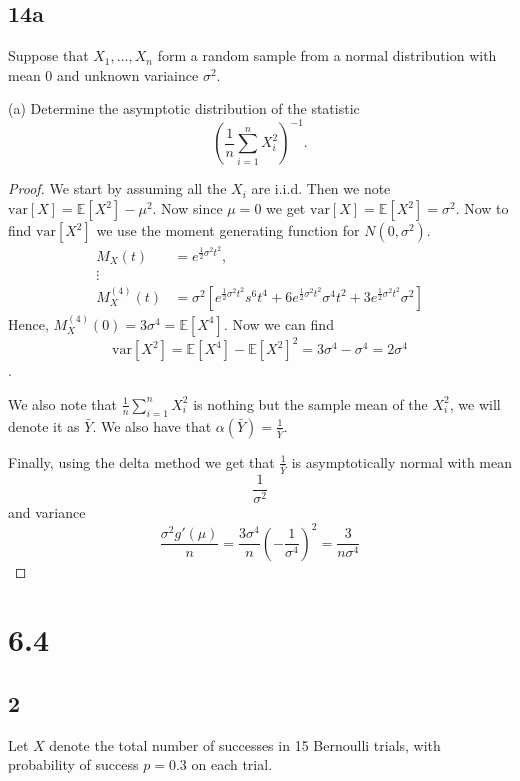 \documentclass{article}
\newcommand{\E}[1]{\mathbb{E}\left[#1\right]}
\newcommand{\var}[1]{\text{var}\left[#1\right]}
\newcommand{\randsamp}{X_1,\dots,X_n}
\newcommand{\mgf}{moment generating function }
\begin{document}
\subsection*{14a}
Suppose that $\randsamp$ form a random sample from a normal distribution with mean 0 and
unknown variaince $\sigma^2$.

(a) Determine the asymptotic distribution of the statistic
\begin{equation*}
    \left(\frac{1}{n}\sum_{i=1}^nX_i^2\right)^{-1}.
\end{equation*}

\begin{proof}
    We start by assuming all the $X_i$ are i.i.d. Then we note $\var{X} = \E{X^2} - \mu^2$.
    Now since $\mu = 0$ we get $\var{X} = \E{X^2} = \sigma^2$. Now to find $\var{X^2}$ we
    use the \mgf for $N(0, \sigma^2)$.
    \begin{align*}
        M_X(t)       & = e^{\frac{1}{2}\sigma^2t^2},                                                                                                         \\
        \vdots                                                                                                                                               \\
        M_X^{(4)}(t) & = \sigma^2\left[e^{\frac{1}{2}\sigma^2t^2}s^6t^4 + 6e^{\frac{1}{2}\sigma^2t^2}\sigma^4t^2 +3e^{\frac{1}{2}\sigma^2t^2}\sigma^2\right]
    \end{align*}
    Hence, $M_X^{(4)}(0) = 3\sigma^4 = \E{X^4}$.
    Now we can find \[\var{X^2} = \E{X^4} - \E{X^2}^2 = 3\sigma^4 - \sigma^4 = 2\sigma^4\].

    We also note that $\frac{1}{n}\sum_{i=1}^n X_i^2$ is nothing but the sample mean of the
    $X_i^2$, we will denote it as $\bar{Y}$. We also have that
    $\alpha(\bar{Y}) = \frac{1}{\bar{Y}}$.

    Finally, using the delta method we get that $\frac{1}{\bar{Y}}$ is asymptotically
    normal with mean \[\frac{1}{\sigma^2}\] and variance
    \[\frac{\sigma^2g'(\mu)}{n} = \frac{3\sigma^4}{n}\left(-\frac{1}{\sigma^4}\right)^2
        = \frac{3}{n\sigma^4}\]
\end{proof}

\section*{6.4}
\subsection*{2}
Let $X$ denote the total number of successes in 15 Bernoulli trials, with probability of
success $p = 0.3$ on each trial.
\end{document}
